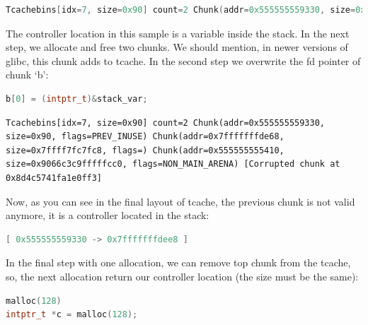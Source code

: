 \documentclass{masterthesis}
\newcommand*\libc{glibc}
\newcommand*\tch{tcache}
\begin{document}
\begin{lstlisting}[language=c,frame=tlrb]
Tcachebins[idx=7, size=0x90] count=2 Chunk(addr=0x555555559330, size=0x90, flags=PREV_INUSE) Chunk(addr=0x5555555592a0, size=0x90, flags=PREV_INUSE)
\end{lstlisting}

The controller location in this sample is a variable inside the stack. In the next step, we allocate and free two chunks. We should mention, in newer versions of \libc{}, this chunk adds to \tch{}.
In the second step we overwrite the fd pointer of chunk ‘b’:

\begin{lstlisting}[language=c,frame=tlrb]
b[0] = (intptr_t)&stack_var;
\end{lstlisting}

\begin{lstlisting}[frame=tlrb]
Tcachebins[idx=7, size=0x90] count=2 Chunk(addr=0x555555559330, size=0x90, flags=PREV_INUSE) Chunk(addr=0x7fffffffde68, size=0x7ffff7fc7fc8, flags=) Chunk(addr=0x555555555410, size=0x9066c3c9fffffcc0, flags=NON_MAIN_ARENA) [Corrupted chunk at 0x8d4c5741fa1e0ff3]
\end{lstlisting}

Now, as you can see in the final layout of \tch{}, the previous chunk is not valid anymore, it is a controller located in the stack:
\begin{lstlisting}[language=c,frame=tlrb]
[ 0x555555559330 -> 0x7fffffffdee8 ]
\end{lstlisting}
In the final step with one allocation, we can remove top chunk from the \tch{}, so, the next allocation return our controller location (the size must be the same):
\begin{lstlisting}[language=c,frame=tlrb]
malloc(128)
intptr_t *c = malloc(128);
\end{lstlisting}
\end{document}
